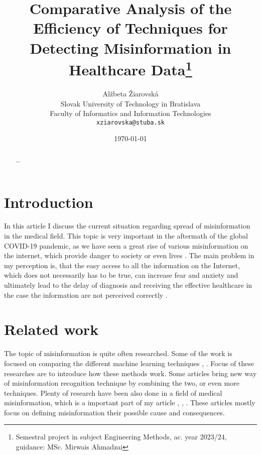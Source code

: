 \documentclass[11pt ,english,a4paper]{article}
\title{Comparative Analysis of the Efficiency of Techniques for Detecting Misinformation in Healthcare Data\thanks{Semestral project in subject Engineering Methods, ac. year 2023/24, guidance: MSc. Mirwais Ahmadzai}}
\author{Alžbeta Žiarovská\\[2pt]
	{\small Slovak University of Technology in Bratislava}\\
	{\small Faculty of Informatics and Information Technologies}\\
	{\small \texttt{xziarovska@stuba.sk}}
	}
\date{\small \today}
\begin{document}
\maketitle
\newpage

\begin{abstract}
\ldots
\end{abstract}
\newpage

\section{Introduction}\label{intro}

In this article I discuss the current situation regarding spread of misinformation in the medical field. This topic is very important in the aftermath of the global COVID-19 pandemic, as we have seen a great rise of various misinformation on the internet, which provide danger to society or even lives \cite{war18dr}. The main problem in my perception is, that the easy access to all the information on the Internet, which does not necessarily has to be true, can increase fear and anxiety and ultimately lead to the delay of diagnosis and receiving the effective healthcare in the case the information are not perceived correctly \cite{wa19sys}. 


\section{Related work}

The topic of misinformation is quite often researched. Some of the work is focused on comparing the different machine learning techniques \cite{sha20mach}, \cite{pod19mach}. Focus of these researches are to introduce how these methods work. Some articles bring new way of misinformation recognition technique \cite{chap22unmask} by combining the two, or even more techniques. Plenty of research have been also done in a field of medical misinformation, which is a important part of my article \cite{gu20misinfo}, \cite{cook15misinfo}, \cite{wa19sys}. These articles mostly focus on defining misinformation their possible cause and consequences.
\end{document}
